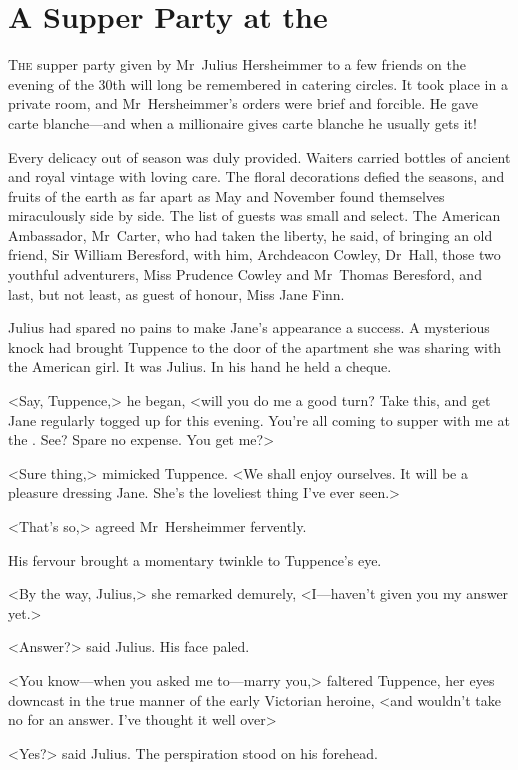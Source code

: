 \chapter{A Supper Party at the } 

\lettrine{T}{he} supper party given by Mr~Julius Hersheimmer to a few friends on the evening of the 30th will long be remembered in catering circles. It took place in a private room, and Mr~Hersheimmer's orders were brief and forcible. He gave carte blanche—and when a millionaire gives carte blanche he usually gets it!

Every delicacy out of season was duly provided. Waiters carried bottles of ancient and royal vintage with loving care. The floral decorations defied the seasons, and fruits of the earth as far apart as May and November found themselves miraculously side by side. The list of guests was small and select. The American Ambassador, Mr~Carter, who had taken the liberty, he said, of bringing an old friend, Sir William Beresford, with him, Archdeacon Cowley, Dr~Hall, those two youthful adventurers, Miss Prudence Cowley and Mr~Thomas Beresford, and last, but not least, as guest of honour, Miss Jane Finn.

Julius had spared no pains to make Jane's appearance a success. A mysterious knock had brought Tuppence to the door of the apartment she was sharing with the American girl. It was Julius. In his hand he held a cheque.

<Say, Tuppence,> he began, <will you do me a good turn? Take this, and get Jane regularly togged up for this evening. You're all coming to supper with me at the . See? Spare no expense. You get me?>

<Sure thing,> mimicked Tuppence. <We shall enjoy ourselves. It will be a pleasure dressing Jane. She's the loveliest thing I've ever seen.>

<That's so,> agreed Mr~Hersheimmer fervently.

His fervour brought a momentary twinkle to Tuppence's eye.

<By the way, Julius,> she remarked demurely, <I—haven't given you my answer yet.>

<Answer?> said Julius. His face paled.

<You know—when you asked me to—marry you,> faltered Tuppence, her eyes downcast in the true manner of the early Victorian heroine, <and wouldn't take no for an answer. I've thought it well over\longdash>

<Yes?> said Julius. The perspiration stood on his forehead.

